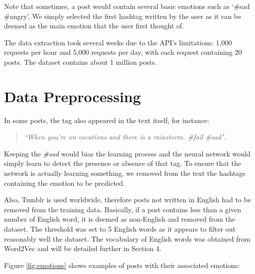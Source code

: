 Note that sometimes, a post would contain several basic emotions such as `\#sad \#angry'. We simply selected the first hashtag written by the user as it can be deemed as the main emotion that the user first thought of.

The data extraction took several weeks due to the API's limitations: 1,000 requests per hour and 5,000 requests per day, with each request containing 20 posts. The dataset contains about 1 million posts.

\section{Data Preprocessing}
In some posts, the tag also appeared in the text itself, for instance:
\begin{quote}
\textit{``When you're on vacations and there is a rainstorm. \#fail \#sad"}.
\end{quote}
Keeping the \textit{\#sad} would bias the learning process and the neural network would simply learn to detect the presence or absence of that tag. To ensure that the network is actually learning something, we removed from the text the hashtags containing the emotion to be predicted.

Also, Tumblr is used worldwide, therefore posts not written in English had to be removed from the training data. Basically, if a post contains less than a given number of English word, it is deemed as non-English and removed from the dataset. The threshold was set to 5 English words as it appears to filter out reasonably well the dataset. The vocabulary of English words was obtained from Word2Vec and will be detailed further in Section 4.

Figure \ref{fig:emotions} shows examples of posts with their associated emotions:

